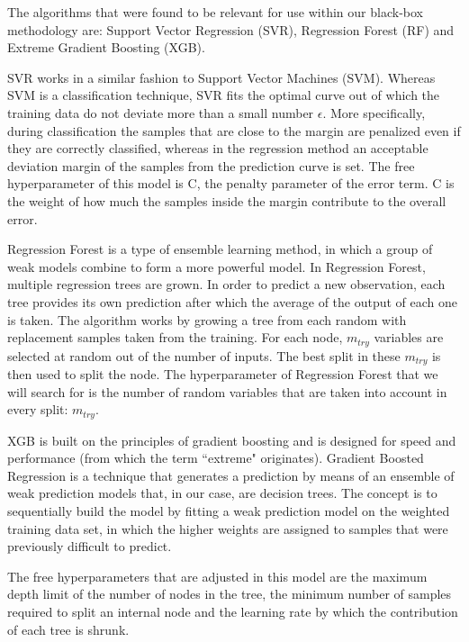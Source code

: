 \documentclass[10pt, conference, compsocconf]{IEEEtran}
\begin{document}
The algorithms that were found to be relevant for use within our black-box methodology are: Support Vector Regression (SVR), Regression Forest (RF) and Extreme Gradient Boosting (XGB). 

SVR works in a similar fashion to Support Vector Machines (SVM). Whereas SVM is a classification technique, SVR fits the optimal curve out of which the training data do not deviate more than a small number $\epsilon$. More specifically, during classification the samples that are close to the margin are penalized even if they are correctly classified, whereas in the regression method an acceptable deviation margin of the samples from the prediction curve is set.
The free hyperparameter of this model is C, the penalty parameter of the error term. C is the weight of how much the samples inside the margin contribute to the overall error.%



Regression Forest is a type of ensemble learning method, in which a group of weak models combine to form a more powerful model. In Regression Forest, multiple regression trees are grown. In order to predict a new observation, each tree provides its own prediction after which the average of the output of each one is taken. The algorithm works by growing a tree from each random with replacement samples taken from the training. For each node, $m_{try}$ variables are selected at random out of the number of inputs. The best split in these $m_{try}$ is then used to split the node. The hyperparameter of Regression Forest that we will search for is the number of random variables that are taken into account in every split: $m_{try}$. 


XGB is built on the principles of gradient boosting and is designed for speed and performance (from which the term ``extreme" originates).
Gradient Boosted Regression is a technique that generates a prediction by means of an ensemble of weak prediction models that, in our case, are decision trees. The concept is to sequentially build the model by fitting a weak prediction model on the weighted training data set, in which the higher weights are assigned to samples that were previously difficult to predict.

The free hyperparameters that are adjusted in this model are the maximum depth limit of the number of nodes in the tree, the minimum number of samples required to split an internal node and the learning rate by which the contribution of each tree is shrunk.
\end{document}
